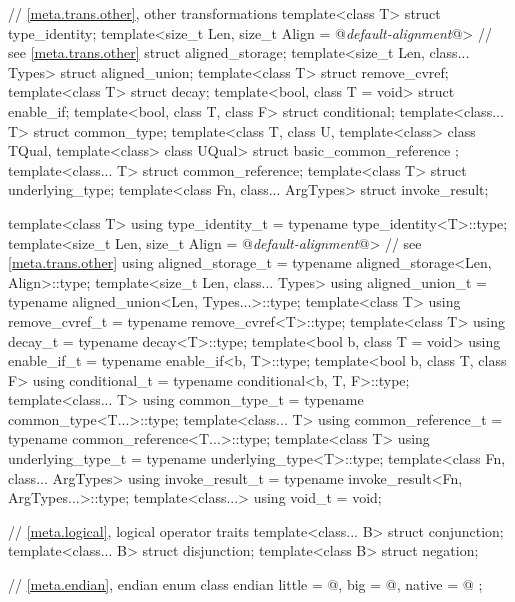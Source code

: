 \begin{codeblock}
{  // \ref{meta.trans.other}, other transformations
  template<class T> struct type_identity;
  template<size_t Len, size_t Align = @\textit{default-alignment}@> // see \ref{meta.trans.other}
    struct aligned_storage;
  template<size_t Len, class... Types> struct aligned_union;
  template<class T> struct remove_cvref;
  template<class T> struct decay;
  template<bool, class T = void> struct enable_if;
  template<bool, class T, class F> struct conditional;
  template<class... T> struct common_type;
  template<class T, class U, template<class> class TQual, template<class> class UQual>
    struct basic_common_reference { };
  template<class... T> struct common_reference;
  template<class T> struct underlying_type;
  template<class Fn, class... ArgTypes> struct invoke_result;

  template<class T>
    using type_identity_t   = typename type_identity<T>::type;
  template<size_t Len, size_t Align = @\textit{default-alignment}@> // see \ref{meta.trans.other}
    using aligned_storage_t  = typename aligned_storage<Len, Align>::type;
  template<size_t Len, class... Types>
    using aligned_union_t    = typename aligned_union<Len, Types...>::type;
  template<class T>
    using remove_cvref_t     = typename remove_cvref<T>::type;
  template<class T>
    using decay_t            = typename decay<T>::type;
  template<bool b, class T = void>
    using enable_if_t        = typename enable_if<b, T>::type;
  template<bool b, class T, class F>
    using conditional_t      = typename conditional<b, T, F>::type;
  template<class... T>
    using common_type_t      = typename common_type<T...>::type;
  template<class... T>
    using common_reference_t = typename common_reference<T...>::type;
  template<class T>
    using underlying_type_t  = typename underlying_type<T>::type;
  template<class Fn, class... ArgTypes>
    using invoke_result_t    = typename invoke_result<Fn, ArgTypes...>::type;
  template<class...>
    using void_t             = void;

  // \ref{meta.logical}, logical operator traits
  template<class... B> struct conjunction;
  template<class... B> struct disjunction;
  template<class B> struct negation;

  // \ref{meta.endian}, endian
  enum class endian {
    little = @\seebelow@,
    big    = @\seebelow@,
    native = @\seebelow@
  };

}
\end{codeblock}
